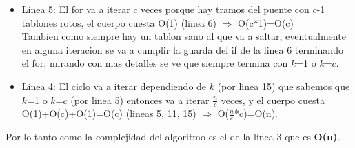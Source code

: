 \begin{itemize}
\begin{itemize}
			\item Línea 5: El for va a iterar $c$ veces porque hay tramos del puente con $c$-1 tablones rotos, el cuerpo cuesta O(1) (linea 6) $\Rightarrow$ O(c*1)=O(c) \\
Tambien como siempre hay un tablon sano al que va a saltar, eventualmente en alguna iteracion se va a cumplir la guarda del if de la linea 6 terminando el for, mirando con mas detalles se ve que siempre termina con  $k$=1 o $k$=$c$.
			
			\item Línea 4: El ciclo va a iterar dependiendo de $k$ (por linea 15) que sabemos que $k$=1 o $k$=$c$ (por linea 5) entonces va a iterar $\frac{n}{c}$ veces, y el cuerpo cuesta O(1)+O(c)+O(1)=O(c) (lineas 5, 11, 15) $\Rightarrow$ O($\frac{n}{c}$*c)=O(n).
		\end{itemize}
\end{itemize}







Por lo tanto como la complejidad del algoritmo es el de la línea 3 que es \textbf{O(n)}.







